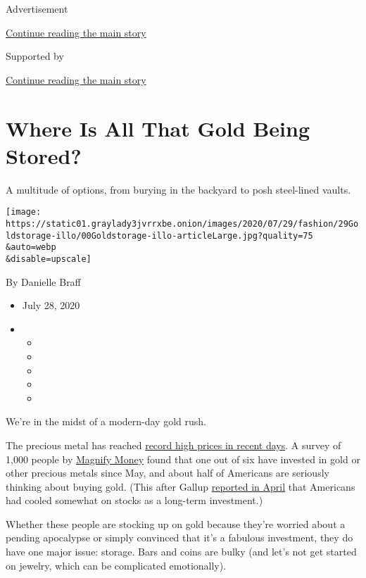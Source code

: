 Advertisement

\protect\hyperlink{after-top}{Continue reading the main story}

Supported by

\protect\hyperlink{after-sponsor}{Continue reading the main story}

\hypertarget{where-is-all-that-gold-being-stored}{%
\section{Where Is All That Gold Being
Stored?}\label{where-is-all-that-gold-being-stored}}

A multitude of options, from burying in the backyard to posh steel-lined
vaults.

\texttt{[image: https://static01.graylady3jvrrxbe.onion/images/2020/07/29/fashion/29Goldstorage-illo/00Goldstorage-illo-articleLarge.jpg?quality=75\\\&auto=webp\\\&disable=upscale]}

By Danielle Braff

\begin{itemize}
\item
  July 28, 2020
\item
  \begin{itemize}
  \item
  \item
  \item
  \item
  \item
  \end{itemize}
\end{itemize}

We're in the midst of a modern-day gold rush.

The precious metal has reached
\href{https://www.nytimes3xbfgragh.onion/2020/07/27/business/gold-prices-record-high.html}{record
high prices in recent days}. A survey of 1,000 people by
\href{https://www.magnifymoney.com}{Magnify Money} found that one out of
six have invested in gold or other precious metals since May, and about
half of Americans are seriously thinking about buying gold. (This after
Gallup
\href{https://news.gallup.com/poll/309233/stock-investments-lose-luster-covid-sell-off.aspx}{reported
in April} that Americans had cooled somewhat on stocks as a long-term
investment.)

Whether these people are stocking up on gold because they're worried
about a pending apocalypse or simply convinced that it's a fabulous
investment, they do have one major issue: storage. Bars and coins are
bulky (and let's not get started on jewelry, which can be complicated
emotionally).

